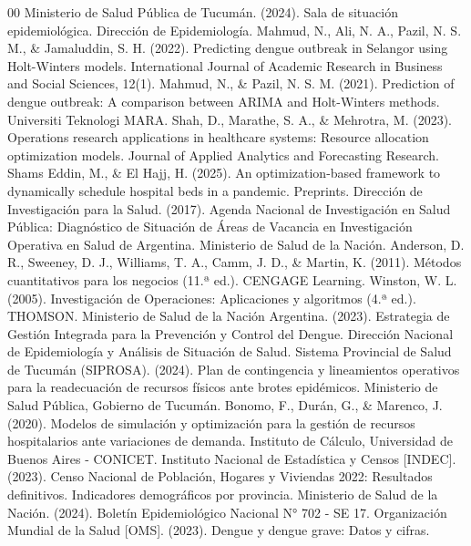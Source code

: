 \documentclass[conference]{IEEEtran}
\begin{document}
\begin{thebibliography}{00}
     Ministerio de Salud Pública de Tucumán. (2024). Sala de situación epidemiológica. Dirección de Epidemiología.
     Mahmud, N., Ali, N. A., Pazil, N. S. M., \& Jamaluddin, S. H. (2022). Predicting dengue outbreak in Selangor using Holt-Winters models. International Journal of Academic Research in Business and Social Sciences, 12(1).
     Mahmud, N., \& Pazil, N. S. M. (2021). Prediction of dengue outbreak: A comparison between ARIMA and Holt-Winters methods. Universiti Teknologi MARA.
     Shah, D., Marathe, S. A., \& Mehrotra, M. (2023). Operations research applications in healthcare systems: Resource allocation optimization models. Journal of Applied Analytics and Forecasting Research.
     Shams Eddin, M., \& El Hajj, H. (2025). An optimization-based framework to dynamically schedule hospital beds in a pandemic. Preprints.
     Dirección de Investigación para la Salud. (2017). Agenda Nacional de Investigación en Salud Pública: Diagnóstico de Situación de Áreas de Vacancia en Investigación Operativa en Salud de Argentina. Ministerio de Salud de la Nación.
     Anderson, D. R., Sweeney, D. J., Williams, T. A., Camm, J. D., \& Martin, K. (2011). Métodos cuantitativos para los negocios (11.ª ed.). CENGAGE Learning.
     Winston, W. L. (2005). Investigación de Operaciones: Aplicaciones y algoritmos (4.ª ed.). THOMSON.
     Ministerio de Salud de la Nación Argentina. (2023). Estrategia de Gestión Integrada para la Prevención y Control del Dengue. Dirección Nacional de Epidemiología y Análisis de Situación de Salud.
     Sistema Provincial de Salud de Tucumán (SIPROSA). (2024). Plan de contingencia y lineamientos operativos para la readecuación de recursos físicos ante brotes epidémicos. Ministerio de Salud Pública, Gobierno de Tucumán.
     Bonomo, F., Durán, G., \& Marenco, J. (2020). Modelos de simulación y optimización para la gestión de recursos hospitalarios ante variaciones de demanda. Instituto de Cálculo, Universidad de Buenos Aires - CONICET.
     Instituto Nacional de Estadística y Censos [INDEC]. (2023). Censo Nacional de Población, Hogares y Viviendas 2022: Resultados definitivos. Indicadores demográficos por provincia.
     Ministerio de Salud de la Nación. (2024). Boletín Epidemiológico Nacional N° 702 - SE 17.
     Organización Mundial de la Salud [OMS]. (2023). Dengue y dengue grave: Datos y cifras.

\end{thebibliography}
\end{document}
